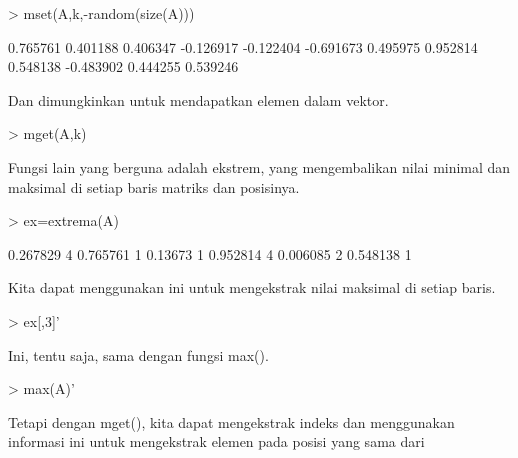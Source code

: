 \documentclass[a4paper,10pt]{article}
\begin{document}
\begin{eulernotebook}
\begin{eulercomment}
\begin{eulercomment}
\begin{eulercomment}
\begin{eulercomment}
\begin{eulercomment}
\begin{eulercomment}
\begin{eulerprompt}
> mset(A,k,-random(size(A)))
\end{eulerprompt}
\begin{euleroutput}
       0.765761      0.401188      0.406347     -0.126917 
      -0.122404     -0.691673      0.495975      0.952814 
       0.548138     -0.483902      0.444255      0.539246 
\end{euleroutput}
\begin{eulercomment}
Dan dimungkinkan untuk mendapatkan elemen dalam vektor.
\end{eulercomment}
\begin{eulerprompt}
> mget(A,k)
\end{eulerprompt}
\begin{euleroutput}
  [0.267829,  0.13673,  0.390567,  0.006085]
\end{euleroutput}
\begin{eulercomment}
Fungsi lain yang berguna adalah ekstrem, yang mengembalikan nilai
minimal dan maksimal di setiap baris matriks dan posisinya.
\end{eulercomment}
\begin{eulerprompt}
> ex=extrema(A)
\end{eulerprompt}
\begin{euleroutput}
       0.267829             4      0.765761             1 
        0.13673             1      0.952814             4 
       0.006085             2      0.548138             1 
\end{euleroutput}
\begin{eulercomment}
Kita dapat menggunakan ini untuk mengekstrak nilai maksimal di setiap
baris.
\end{eulercomment}
\begin{eulerprompt}
> ex[,3]'
\end{eulerprompt}
\begin{euleroutput}
  [0.765761,  0.952814,  0.548138]
\end{euleroutput}
\begin{eulercomment}
Ini, tentu saja, sama dengan fungsi max().
\end{eulercomment}
\begin{eulerprompt}
> max(A)'
\end{eulerprompt}
\begin{euleroutput}
  [0.765761,  0.952814,  0.548138]
\end{euleroutput}
\begin{eulercomment}
Tetapi dengan mget(), kita dapat mengekstrak indeks dan menggunakan
informasi ini untuk mengekstrak elemen pada posisi yang sama dari

\end{eulercomment}
\end{eulercomment}
\end{eulercomment}
\end{eulercomment}
\end{eulercomment}
\end{eulercomment}
\end{eulercomment}
\end{eulernotebook}
\end{document}
